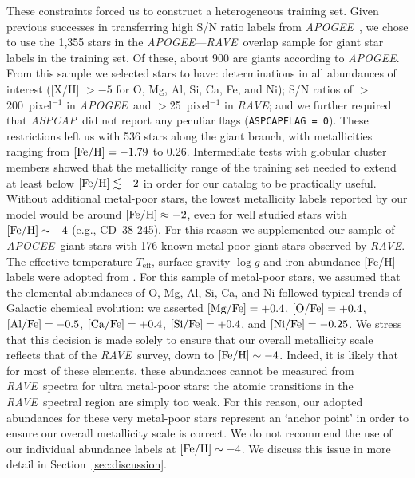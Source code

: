 \documentclass[preprint,trackchanges]{aastex}
\newcommand{\acronym}[1]{{\small{#1}}}
\newcommand{\project}[1]{\textsl{#1}}
\newcommand{\rave}{\project{\acronym{RAVE}}}
\newcommand{\apogee}{\project{\acronym{APOGEE}}}
\newcommand{\aspcap}{\project{\acronym{ASPCAP}}}
\newcommand{\teff}{T_{\mathrm{eff}}}
\newcommand{\logg}{\log g}
\begin{document}
These constraints forced us to construct a heterogeneous training set.  Given previous
successes in transferring high S/N ratio labels from \apogee\ \citep{Ness_2015,
Ness_2016,Ho_2016,Casey_2016b}, we chose to use the 1,355 stars in the \apogee---\rave\ 
overlap sample for giant star labels in the training set.  Of these, about 900 are 
giants according to \apogee.  From this sample we selected stars to have: 
determinations in all abundances of interest ([X/H] $> -5$ for O, Mg, Al, Si, Ca, Fe, 
and Ni); S/N ratios of $>$200~pixel$^{-1}$ in \apogee\ and $>$25~pixel$^{-1}$ in \rave; 
and we further required that \aspcap\ did not report any peculiar flags 
(\texttt{ASPCAPFLAG = 0}).  These restrictions left us with 536 stars along the giant 
branch, with metallicities ranging from $[{\rm Fe/H}] = -1.79$ to 0.26.  Intermediate 
tests with globular cluster members showed that the metallicity range of the training 
set needed to extend at least below $[{\rm Fe/H}] \lesssim -2$ in order for our catalog 
to be practically useful.  Without additional metal-poor stars, the lowest metallicity
labels reported by our model would be around $[{\rm Fe/H}] \approx -2$, even for well
studied stars with $[{\rm Fe/H}] \sim -4$ (e.g., CD~38-245).  For this reason we
supplemented our sample of \apogee\ giant stars with 176 known metal-poor giant stars 
observed by \rave.  The effective temperature $\teff$, surface gravity $\logg$ and
iron abundance [Fe/H] labels were adopted from \citet{Fulbright_2010, Ruchti_2011}.
For this sample of metal-poor stars, we assumed that the elemental abundances of O, 
Mg, Al, Si, Ca, and Ni followed typical trends of Galactic chemical evolution: we
asserted $[{\rm Mg/Fe}] = +0.4$, $[{\rm O/Fe}] = +0.4$, $[{\rm Al/Fe}] = -0.5$, 
$[{\rm Ca/Fe}] = +0.4$, $[{\rm Si/Fe}] = +0.4$, and $[{\rm Ni/Fe}] = -0.25$.  We stress
that this decision is made solely to ensure that our overall metallicity scale reflects
that of the \rave\ survey, down to $[{\rm Fe/H}] \sim -4$.  Indeed, it is likely that 
for most of these elements, these abundances cannot be measured from \rave\ spectra for 
ultra metal-poor stars: the atomic transitions in the \rave\ spectral region are simply
too weak.  For this reason, our adopted abundances for these very metal-poor stars
represent an `anchor point' in order to ensure our overall metallicity scale is
correct.  We do not recommend the use of our individual abundance labels at 
$[{\rm Fe/H}] \sim -4$.  We discuss this issue in more detail in Section~\ref{sec:discussion}.
\end{document}
